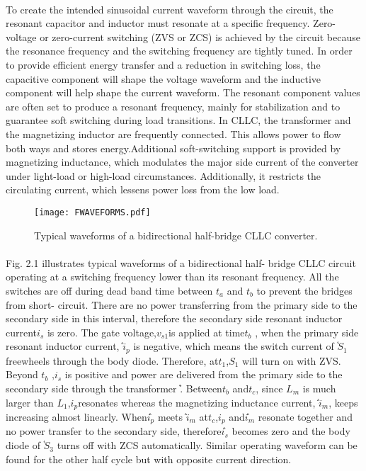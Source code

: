 \documentclass{book}
\begin{document}
	\paragraph{}
	To create the intended sinusoidal current waveform through the circuit, the resonant capacitor and inductor must resonate at a specific frequency. Zero-voltage or zero-current switching (ZVS or ZCS) is achieved by the circuit because the resonance frequency and the switching frequency are tightly tuned. In order to provide efficient energy transfer and a reduction in switching loss, the capacitive component will shape the voltage waveform and the inductive component will help shape the current waveform. The resonant component values are often set to produce a resonant frequency, mainly for stabilization and to guarantee soft switching during load transitions. In CLLC, the transformer and the magnetizing inductor are frequently connected. This allows power to flow both ways and stores energy.Additional soft-switching support is provided by magnetizing inductance, which modulates the major side current of the converter under light-load or high-load circumstances. Additionally, it restricts the circulating current, which lessens power loss from the low load.
          \begin{figure}[ht]
		\centering
		\texttt{[image: FWAVEFORMS.pdf]} %
		\caption{Typical waveforms of a bidirectional half-bridge CLLC converter.}
	\end{figure}
    \paragraph{}
          Fig. 2.1 illustrates typical waveforms of a bidirectional half-
bridge CLLC circuit operating at a switching frequency lower
than its resonant frequency. All the switches are off during dead
band time between \( t_{a} \) and \( t_{b} \) to prevent the bridges from short-
circuit. There are no power transferring from the primary side to
the secondary side in this interval, therefore the secondary side
resonant inductor current\( i_{s} \) is zero. The gate voltage,\( v_{s1} \)is
applied at time\( t_{b} \) , when the primary side resonant inductor
current,݅ \( i_{p} \)  is negative, which means the switch current ofܵ \( S_{1} \)
freewheels through the body diode. Therefore, at\( t_{1} \),\( S_{1} \) will
turn on with ZVS. Beyond \( t_{b} \) ,\( i_{s} \) is positive and power are
delivered from the primary side to the secondary side through
the transformerܶ . Between\( t_{b} \) and\( t_{c} \), since \( L_{m} \) is much larger
than \( L_{1} \),\( i_{p} \)resonates whereas the magnetizing inductance
current,݅ \( i_{m} \), keeps increasing almost linearly. When݅\( i_{p} \) meets݅  \( i_{m} \)
at\( t_{c} \),\( i_{p} \) and݅\( i_{m} \) resonate together and no power transfer to the
secondary side, therefore݅\( i_{s} \) becomes zero and the body diode ofܵ 
\( S_{3} \) turns off with ZCS automatically. Similar operating
waveform can be found for the other half cycle but with opposite
current direction.
\end{document}
